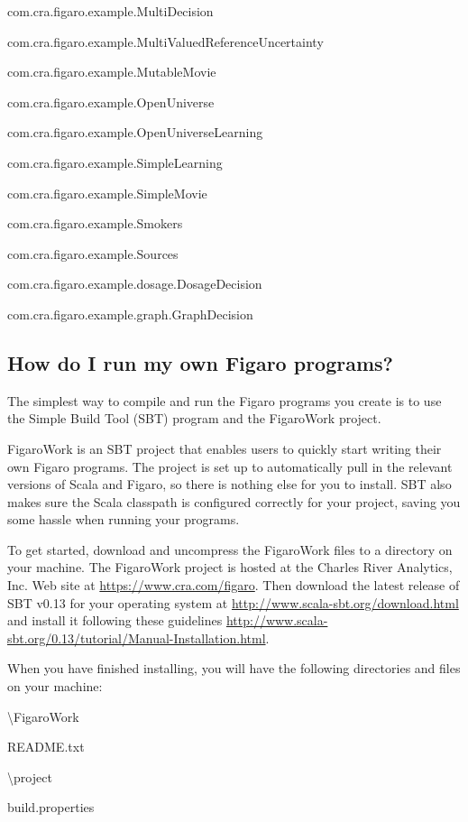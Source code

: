 \documentclass[]{article}
\begin{document}
com.cra.figaro.example.MultiDecision

com.cra.figaro.example.MultiValuedReferenceUncertainty

com.cra.figaro.example.MutableMovie

com.cra.figaro.example.OpenUniverse

com.cra.figaro.example.OpenUniverseLearning

com.cra.figaro.example.SimpleLearning

com.cra.figaro.example.SimpleMovie

com.cra.figaro.example.Smokers

com.cra.figaro.example.Sources

com.cra.figaro.example.dosage.DosageDecision

com.cra.figaro.example.graph.GraphDecision

\subsection{How do I run my own Figaro
programs?}\label{how-do-i-run-my-own-figaro-programs}

The simplest way to compile and run the Figaro programs you create is to
use the Simple Build Tool (SBT) program and the FigaroWork project.

FigaroWork is an SBT project that enables users to quickly start writing
their own Figaro programs. The project is set up to automatically pull
in the relevant versions of Scala and Figaro, so there is nothing else
for you to install. SBT also makes sure the Scala classpath is
configured correctly for your project, saving you some hassle when
running your programs.

To get started, download and uncompress the FigaroWork files to a
directory on your machine. The FigaroWork project is hosted at the
Charles River Analytics, Inc. Web site at
\url{https://www.cra.com/figaro}. Then download the latest release of
SBT v0.13 for your operating system at
\url{http://www.scala-sbt.org/download.html} and install it following
these guidelines
\url{http://www.scala-sbt.org/0.13/tutorial/Manual-Installation.html}.

When you have finished installing, you will have the following
directories and files on your machine:

\textbackslash{}FigaroWork

README.txt

\textbackslash{}project

build.properties
\end{document}
